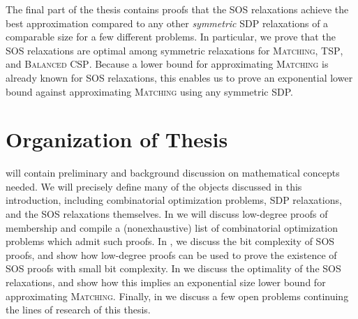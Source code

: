 The final part of the thesis contains proofs that the SOS relaxations achieve the best approximation compared to any other \emph{symmetric} SDP relaxations of a comparable size for a few different problems. In particular, we prove that the SOS relaxations are optimal among symmetric relaxations for \textsc{Matching}, \textsc{TSP}, and \textsc{Balanced CSP}. Because a lower bound for approximating \textsc{Matching} is already known for SOS relaxations, this enables us to prove an exponential lower bound against approximating \textsc{Matching} using any symmetric SDP.

\section{Organization of Thesis}

 will contain preliminary and background discussion on mathematical concepts needed. We will precisely define many of the objects discussed in this introduction, including combinatorial optimization problems, SDP relaxations, and the SOS relaxations themselves. In  we will discuss low-degree proofs of membership and compile a (nonexhaustive) list of combinatorial optimization problems which admit such proofs. In , we discuss the bit complexity of SOS proofs, and show how low-degree proofs can be used to prove the existence of SOS proofs with small bit complexity. In  we discuss the optimality of the SOS relaxations, and show how this implies an exponential size lower bound for approximating \textsc{Matching}. Finally, in  we discuss a few open problems continuing the lines of research of this thesis.
